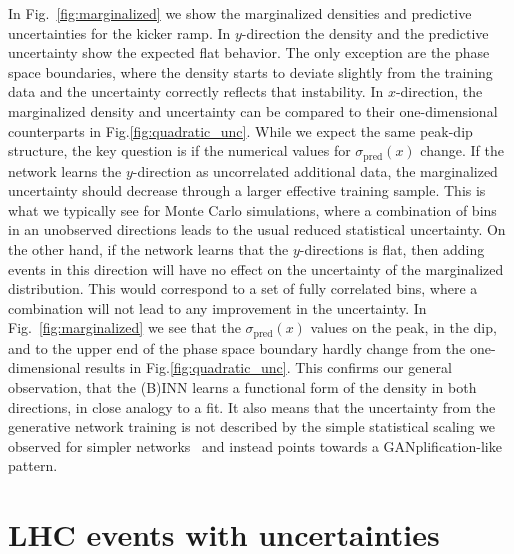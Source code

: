 In Fig.~\ref{fig:marginalized} we show the marginalized densities and
predictive uncertainties for the kicker ramp.  In $y$-direction the
density and the predictive uncertainty show the expected flat
behavior. The only exception are the phase space boundaries, where the
density starts to deviate slightly from the training data and the
uncertainty correctly reflects that instability.  In $x$-direction,
the marginalized density and uncertainty can be compared to their
one-dimensional counterparts in Fig.\ref{fig:quadratic_unc}. While we
expect the same peak-dip structure, the key question is if the
numerical values for $\sigma_\text{pred}(x)$ change. If the network
learns the $y$-direction as uncorrelated additional data, the
marginalized uncertainty should decrease through a larger effective
training sample. This is what we typically see for Monte Carlo
simulations, where a combination of bins in an unobserved directions
leads to the usual reduced statistical uncertainty. On the other hand,
if the network learns that the $y$-directions is flat, then adding
events in this direction will have no effect on the uncertainty of the
marginalized distribution. This would correspond to a set of fully
correlated bins, where a combination will not lead to any improvement
in the uncertainty. In Fig.~\ref{fig:marginalized} we see that the
$\sigma_\text{pred}(x)$ values on the peak, in the dip, and to the
upper end of the phase space boundary hardly change from the
one-dimensional results in Fig.\ref{fig:quadratic_unc}. This confirms
our general observation, that the (B)INN learns a functional form of
the density in both directions, in close analogy to a fit. It also
means that the uncertainty from the generative network training is not
described by the simple statistical scaling we observed for simpler
networks~\cite{Bollweg:2019skg,Kasieczka:2020vlh} and instead points
towards a GANplification-like~\cite{Butter:2020qhk} pattern.

\section{LHC events with uncertainties}
\label{sec:lhc}

